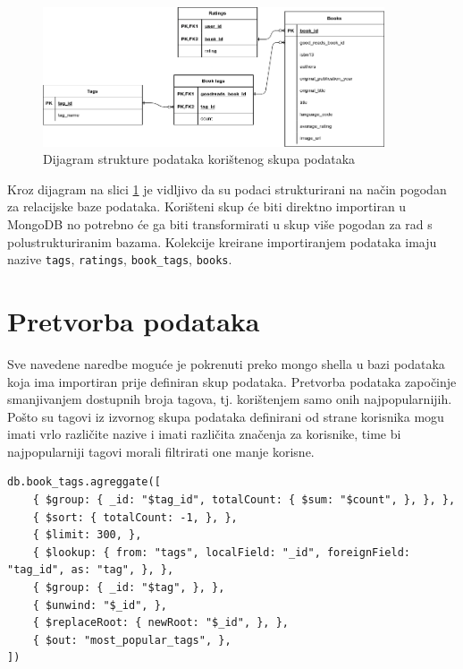 \documentclass[]{foi}
\begin{document}
\begin{figure}[h!]
	\centering
	\includegraphics[width=0.9\textwidth]{slike/goodbooks-10k_dijagram.png}
	\caption{Dijagram strukture podataka korištenog skupa podataka}
	\label{fig:struktura_podataka}
\end{figure}

Kroz dijagram na slici \ref{fig:struktura_podataka} je vidljivo da su podaci strukturirani na način pogodan za relacijske baze podataka.
Korišteni skup će biti direktno importiran u MongoDB no potrebno će ga biti transformirati u skup više pogodan za rad s polustrukturiranim bazama.
Kolekcije kreirane importiranjem podataka imaju nazive \texttt{tags}, \texttt{ratings}, \texttt{book\_tags}, \texttt{books}.

\section{Pretvorba podataka}

Sve navedene naredbe moguće je pokrenuti preko mongo shella u bazi podataka koja ima importiran prije definiran skup podataka.
Pretvorba podataka započinje smanjivanjem dostupnih broja tagova, tj. korištenjem samo onih najpopularnijih. Pošto su tagovi iz izvornog
skupa podataka definirani od strane korisnika mogu imati vrlo različite nazive i imati različita značenja za korisnike, time bi
najpopularniji tagovi morali filtrirati one manje korisne.

\begin{verbatim}
db.book_tags.agreggate([
    { $group: { _id: "$tag_id", totalCount: { $sum: "$count", }, }, },
    { $sort: { totalCount: -1, }, },
    { $limit: 300, },
    { $lookup: { from: "tags", localField: "_id", foreignField: "tag_id", as: "tag", }, },
    { $group: { _id: "$tag", }, },
    { $unwind: "$_id", },
    { $replaceRoot: { newRoot: "$_id", }, },
    { $out: "most_popular_tags", },
])
\end{verbatim}
\label{lst:tagovi}
\end{document}
